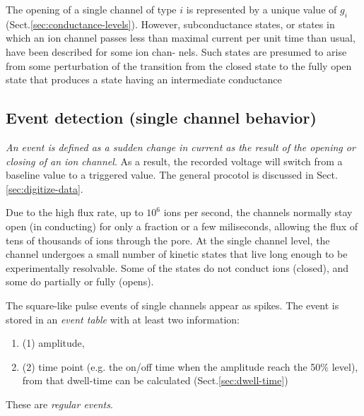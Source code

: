 The opening of a single channel of type $i$ is represented by a unique value of
$g_i$ (Sect.\ref{sec:conductance-levels}).
However, subconductance states, or states in which an ion channel passes less
than maximal current per unit time than usual, have been described for some ion
chan- nels. Such states are presumed to arise from some perturbation of the
transition from the closed state to the fully open state that produces a state
having an intermediate conductance


\subsection{Event detection (single channel behavior)}
\label{sec:event-detection}

{\it An event is defined as a sudden change in current as the result of the
opening or closing of an ion channel}. As a result, the recorded voltage will
switch from a baseline value to a triggered  value. The general procotol is
discussed in Sect.\ref{sec:digitize-data}.

Due to the high flux rate, up to $10^6$ ions per second, the channels normally
stay open (in conducting) for only a fraction or a few miliseconds, allowing the
flux of tens of thousands of ions through the pore. At the single channel level,
the channel undergoes a small number of kinetic states that live long enough to
be experimentally resolvable. Some of the states do not conduct ions (closed),
and some do partially or fully (opens).

The square-like pulse events of single channels appear as spikes. The event is
stored in an {\it event table} with at least two information:
\begin{enumerate}
  \item (1) amplitude,

  \item (2) time point (e.g. the on/off time when the amplitude reach the 50\%
  level), from that dwell-time can be calculated (Sect.\ref{sec:dwell-time})
\end{enumerate}
These are {\it regular events}.

